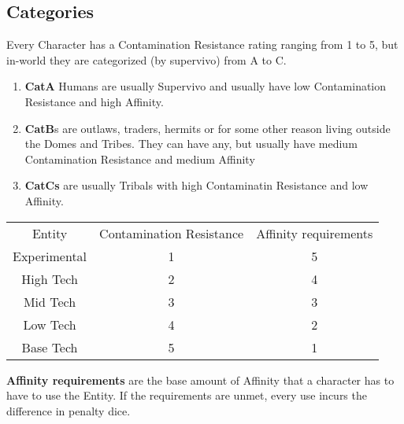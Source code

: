 \subsection{Categories}\label{subsec:categories}
Every Character has a Contamination Resistance rating ranging from 1 to 5,
but in-world they are categorized (by supervivo) from A to C\@.
\begin{enumerate}[label = - ]
\item \textbf{CatA} Humans are usually Supervivo and usually have low Contamination Resistance
                    and high Affinity.
\item \textbf{CatB}s are outlaws, traders, hermits or for some other reason living outside the Domes and Tribes.
                    They can have any, but usually have medium Contamination Resistance and medium Affinity
\item \textbf{CatCs} are usually Tribals with high Contaminatin Resistance and low Affinity.
\end{enumerate}
\begin{tabular}{c|cc}
    Entity & Contamination Resistance  & Affinity requirements\\
    Experimental & 1 & 5 \\
    High Tech & 2 & 4\\
    Mid Tech & 3 & 3 \\
    Low Tech & 4 & 2\\
    Base Tech & 5 & 1\\
\end{tabular}

\textbf{Affinity requirements} are the base amount of Affinity that a character has to have to use the Entity.
If the requirements are unmet, every use incurs the difference in penalty dice.


